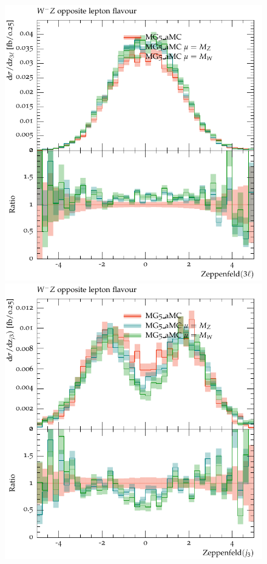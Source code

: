 \begin{figure}[htbp]
\begin{center}
   \includegraphics[scale=0.65]{figs/MG_WmZ_OF_zep3l}
   \includegraphics[scale=0.65]{figs/MG_WmZ_OF_zepj3}

\end{center}
\end{figure}

